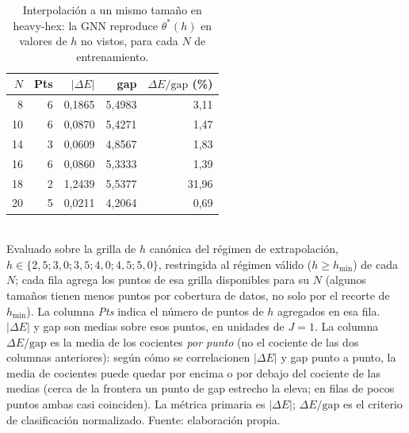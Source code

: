 \begin{table}[htbp]
\centering
\caption[Interpolación a un mismo tamaño (heavy-hex)]{Interpolación a un mismo tamaño en heavy-hex: la GNN reproduce $\theta^*(h)$ en valores de $h$ no vistos, para cada $N$ de entrenamiento.}
\label{tab:auto_heavy_hex_intra_n}
\begin{tabular}{rrrrr}
\toprule
$N$ & Pts & $|\Delta E|$ & gap & $\Delta E/\mathrm{gap}$ (\%) \\
\midrule
8 & 6 & 0,1865 & 5,4983 & 3,11 \\
10 & 6 & 0,0870 & 5,4271 & 1,47 \\
14 & 3 & 0,0609 & 4,8567 & 1,83 \\
16 & 6 & 0,0860 & 5,3333 & 1,39 \\
18 & 2 & 1,2439 & 5,5377 & 31,96 \\
20 & 5 & 0,0211 & 4,2064 & 0,69 \\
\bottomrule
\end{tabular}
\\[2pt]
\footnotesize Evaluado sobre la grilla de $h$ canónica del régimen de extrapolación, $h \in \{2,5; 3,0; 3,5; 4,0; 4,5; 5,0\}$, restringida al régimen válido ($h \geq h_{\min}$) de cada $N$; cada fila agrega los puntos de esa grilla disponibles para su $N$ (algunos tamaños tienen menos puntos por cobertura de datos, no solo por el recorte de $h_{\min}$). La columna \emph{Pts} indica el número de puntos de $h$ agregados en esa fila. $|\Delta E|$ y gap son medias sobre esos puntos, en unidades de $J = 1$. La columna $\Delta E/\mathrm{gap}$ es la media de los cocientes \emph{por punto} (no el cociente de las dos columnas anteriores): según cómo se correlacionen $|\Delta E|$ y gap punto a punto, la media de cocientes puede quedar por encima o por debajo del cociente de las medias (cerca de la frontera un punto de gap estrecho la eleva; en filas de pocos puntos ambas casi coinciden). La métrica primaria es $|\Delta E|$; $\Delta E/\mathrm{gap}$ es el criterio de clasificación normalizado. Fuente: elaboración propia.
\end{table}
